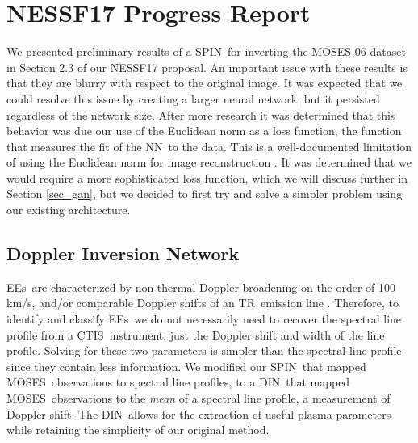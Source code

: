\documentclass[10pt,letterpaper]{article}
\newcommand{\TR}{\ac{TR}}
\newcommand{\EEs}{\acp{EE}}
\newcommand{\CTIS}{\ac{CTIS}}
\newcommand{\MOSES}{\ac{MOSES}}
\newcommand{\NN}{\ac{NN}}
\newcommand{\DIN}{\ac{DIN}}
\newcommand{\SPIN}{\ac{SPIN}}
\begin{document}
	
	\section{NESSF17 Progress Report} 
	
		We presented preliminary results of a \SPIN\ for inverting the \MOSES-06 dataset in Section 2.3 of our NESSF17 proposal.
		An important issue with these results is that they are blurry with respect to the original image.
		It was expected that we could resolve this issue by creating a larger neural network, but it persisted regardless of the network size.
		After more research it was determined that this behavior was due our use of the Euclidean norm as a loss function, the function that measures the fit of the \NN\ to the data.
		This is a well-documented limitation of using the Euclidean norm for image reconstruction \citep{Pathak2016}.
		It was determined that we would require a more sophisticated loss function, which we will discuss further in Section \ref{sec_gan}, but we decided to first try and solve a simpler problem using our existing architecture.
					
		\subsection{Doppler Inversion Network}
		
			\EEs\ are characterized by non-thermal Doppler broadening on the order of 100\,km/s, and/or comparable Doppler shifts of an \TR\ emission line \citep{Dere1989}.
			Therefore, to identify and classify \EEs\ we do not necessarily need to recover the spectral line profile from a \CTIS\ instrument, just the Doppler shift and width of the line profile.
			Solving for these two parameters is simpler than the spectral line profile since they contain less information.
			We modified our \SPIN\ that mapped \MOSES\ observations to spectral line profiles, to a \DIN\ that mapped \MOSES\ observations to the \textit{mean} of a spectral line profile, a measurement of Doppler shift.
			The \DIN\ allows for the extraction of useful plasma parameters while retaining the simplicity of our original method.
			
\end{document}
